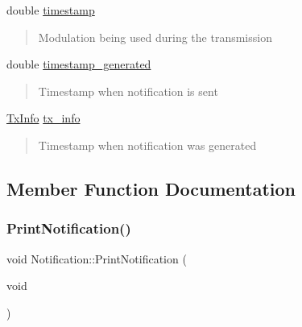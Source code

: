 \begin{DoxyCompactItemize}
double \hyperlink{structNotification_af562f68f9bdd5b058b4f6a20d84f9818}{timestamp}
\begin{DoxyCompactList}\small\item\em \begin{quote}
Modulation being used during the transmission \end{quote}
\end{DoxyCompactList}\item 
\mbox{\label{structNotification_a872687a57485c5a6ebbdba813c3829a1}} 
double \hyperlink{structNotification_a872687a57485c5a6ebbdba813c3829a1}{timestamp\+\_\+generated}
\begin{DoxyCompactList}\small\item\em \begin{quote}
Timestamp when notification is sent \end{quote}
\end{DoxyCompactList}\item 
\mbox{\label{structNotification_ac17bbde3b9c16c42c37eeac3805a1d47}} 
\hyperlink{structTxInfo}{Tx\+Info} \hyperlink{structNotification_ac17bbde3b9c16c42c37eeac3805a1d47}{tx\+\_\+info}
\begin{DoxyCompactList}\small\item\em \begin{quote}
Timestamp when notification was generated \end{quote}
\end{DoxyCompactList}\end{DoxyCompactItemize}


\subsection{Member Function Documentation}
\mbox{\label{structNotification_a88f50763a773d8d9f548df6408d58839}} 
\subsubsection{\texorpdfstring{Print\+Notification()}{PrintNotification()}}
{\footnotesize\ttfamily void Notification\+::\+Print\+Notification (\begin{DoxyParamCaption}\item[{void}]{ }\end{DoxyParamCaption})\hspace{0.3cm}{\ttfamily [inline]}}



